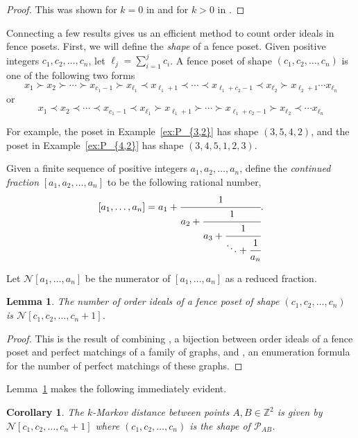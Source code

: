 \documentclass{article}
\newtheorem{lemma}[theorem]{Lemma}
\newtheorem{cor}[theorem]{Corollary}
\theoremstyle{remark}
\newcommand{\calP}{\mathcal{P}}
\begin{document}
\begin{proof}
This was shown for $k=0$ in \cite{LLRS} and for $k > 0$ in \cite{banaian2025}. 
\end{proof}


Connecting a few results gives us an efficient method to count order ideals in fence posets. First, we will define the \emph{shape}  of a fence poset. Given positive integers $c_1,c_2,\ldots,c_n$, let $\ell_j = \sum_{i=1}^j c_i$. A fence poset of shape $(c_1,c_2,\ldots,c_n)$ is one of the following two forms \[
x_1 \succ x_2 \succ \cdots \succ x_{c_1-1} \succ x_{\ell_1} \prec x_{\ell_1+1} \prec \cdots \prec x_{\ell_1 + c_2 - 1} \prec x_{\ell_2}  \succ x_{\ell_2 +1 }\cdots  x_{\ell_n}
\]
or
\[
x_1 \prec x_2 \prec \cdots \prec x_{c_1-1} \prec x_{\ell_1} \succ x_{\ell_1+1} \succ \cdots \succ x_{\ell_1 + c_2 - 1} \succ x_{\ell_2}  \prec \cdots  x_{\ell_n}
\]

For example, the poset in Example~\ref{ex:P_{3,2}} has shape $(3,5,4,2)$, and the poset in Example~\ref{ex:P_{4,2}} has shape $(3,4,5,1,2,3)$. 

Given a finite sequence of positive integers $a_1,a_2,\ldots,a_n$, define the \emph{continued fraction} $[a_1,a_2,\ldots,a_n]$ to be the following rational number,
\[
[a_1,\ldots,a_n] = a_1 + \cfrac{1}{a_2 + \cfrac{1}{a_3 + \cfrac{1}{\ddots + \cfrac{1}{a_n}}}}.
\]

Let $\mathcal{N}[a_1,\ldots,a_n]$ be the numerator of $[a_1,\ldots,a_n]$ as a reduced fraction. 

\begin{lemma}\label{lem:CountOrderIdeals}
The number of order ideals of a fence poset of shape $(c_1,c_2,\ldots,c_n)$ is $\mathcal{N}[c_1,c_2,\ldots,c_n+1]$.
\end{lemma}

\begin{proof}
This is the result of combining \cite[Theorem 5.4]{musiker2013bases}, a bijection between order ideals of a fence poset and perfect matchings of a family of graphs, and \cite[Theorem A]{CSContFrac}, an enumeration formula for the number of perfect matchings of these graphs. 
\end{proof}

Lemma~\ref{lem:CountOrderIdeals} makes the following immediately evident.

\begin{cor}
The $k$-Markov distance between points $A,B \in \mathbb{Z}^2$ is given by $\mathcal{N}[c_1,c_2,\ldots,c_n+1]$ where $(c_1,c_2,\ldots,c_n)$ is the shape of $\calP_{AB}$.
\end{cor}
\end{document}

